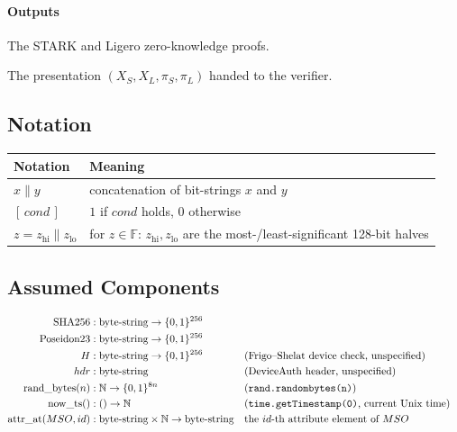 \documentclass[binding=0.6cm,oneside,noexaminfo]{sapthesis}
\newcommand{\FF}{\mathbb{F}}
\newcommand{\concat}{\mathbin{\|}}
\newcommand{\hipart}[1]{{#1}_{\mathrm{hi}}}
\newcommand{\lopart}[1]{{#1}_{\mathrm{lo}}}
\newcommand{\SHA}{\mathrm{SHA256}}
\newcommand{\Poseidon}{\mathrm{Poseidon23}}
\newcommand{\prand}{\mathrm{rand\_bytes}}
\newcommand{\nowts}{\mathrm{now\_ts}}
\newcommand{\attrat}{\mathrm{attr\_at}}
\begin{document}
\paragraph*{Outputs}

\begin{description}[leftmargin=3.5em, labelwidth=3em, style=sameline, itemsep=2pt]
  \item[$\pi_S,\pi_L$] The STARK and Ligero zero-knowledge proofs.
  \item[$Pres$]        The presentation $(X_S, X_L, \pi_S, \pi_L)$ handed to
                       the verifier.
\end{description}

\subsection{Notation}
\label{sec:notation}

\begin{center}
\renewcommand{\arraystretch}{1.35}
\begin{tabular}{@{}ll@{}}
\toprule
\textbf{Notation} & \textbf{Meaning} \\
\midrule
$x \concat y$                       & concatenation of bit-strings $x$ and $y$ \\
$[\,\mathit{cond}\,]$               & $1$ if $\mathit{cond}$ holds, $0$ otherwise \\
$z = \hipart{z} \concat \lopart{z}$ & for $z\in\FF$: $\hipart{z}, \lopart{z}$ are the most-/least-significant 128-bit halves \\
\bottomrule
\end{tabular}
\end{center}

\subsection{Assumed Components}
\label{sec:components}

\begin{align*}
\SHA            &: \text{byte-string} \to \{0,1\}^{256} \\
\Poseidon       &: \text{byte-string} \to \{0,1\}^{256} \\
H               &: \text{byte-string} \to \{0,1\}^{256}
  && \text{(Frigo--Shelat device check, unspecified)} \\
hdr             &: \text{byte-string}
  && \text{(DeviceAuth header, unspecified)} \\
\prand(n)       &: \mathbb{N} \to \{0,1\}^{8n}
  && \text{(\texttt{rand.randombytes(n)})} \\
\nowts()        &: () \to \mathbb{N}
  && \text{(\texttt{time.getTimestamp(0)}, current Unix time)} \\
\attrat(MSO,id) &: \text{byte-string} \times \mathbb{N} \to \text{byte-string}
  && \text{the $id$-th attribute element of $MSO$}
\end{align*}
\end{document}
